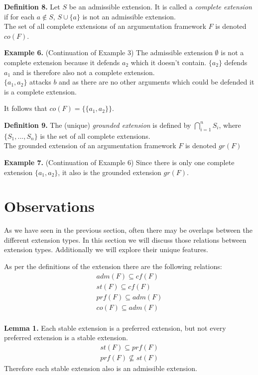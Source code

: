 \documentclass[draft,final]{vutinfth} %
\newcommand{\hl}{\par\medskip}
\newcommand{\dl}{\par\bigskip}
\begin{document}
\textbf{Definition 8.} Let $S$ be an admissible extension. It is called a \emph{complete extension} if for each $a\not\in S$, $S\cup \{a\}$ is not an admissible extension.\\
The set of all complete extensions of an argumentation framework $F$ is denoted $co(F)$.\dl

\textbf{Example 6.} (Continuation of Example 3) The admissible extension $\emptyset$ is not a complete extension because it defends $a_2$ which it doesn't contain. $\{a_2\}$ defends $a_1$ and is therefore also not a complete extension.\\
$\{a_1,a_2\}$ attacks $b$ and as there are no other arguments which could be defended it is a complete extension.\hl
It follows that $co(F)=\{\{a_1,a_2\}\}$.\dl

\textbf{Definition 9.} The (unique) \emph{grounded extension} is defined by $\bigcap\limits_{i=1}^n{S_i}$, where $\{S_1,...,S_n\}$ is the set of all complete extensions.\\
The grounded extension of an argumentation framework $F$ is denoted $gr(F)$\dl

\textbf{Example 7.} (Continuation of Example 6) Since there is only one complete extension $\{a_1,a_2\}$, it also is the grounded extension $gr(F)$.\dl

\chapter{Observations}

As we have seen in the previous section, often there may be overlaps between the different extension types. In this section we will discuss those relations between extension types. Additionally we will explore their unique features.\dl

As per the definitions of the extension there are the following relations:
\begin{align} %
	adm(F)\subseteq cf(F)\\
	st(F)\subseteq cf(F)\\
	prf(F)\subseteq adm(F)\\
	co(F)\subseteq adm(F)\\
\end{align}\dl

\textbf{Lemma 1.} %
Each stable extension is a preferred extension, but not every preferred extension is a stable extension.\\
\begin{align}
	st(F)\subseteq prf(F)\\
	prf(F)\not\subseteq st(F)
\end{align}
Therefore each stable extension also is an admissible extension.\dl
\end{document}
